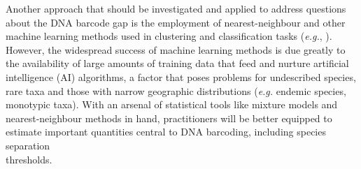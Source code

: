 Another approach that should be investigated and applied to address questions about the DNA barcode gap is the employment of nearest-neighbour and other machine learning methods used in clustering and classification tasks (\textit{e.g.}, \cite{vanvelzen2012dna}). However, the widespread success of machine learning methods is due greatly to the availability of large amounts of training data that feed and nurture artificial intelligence (AI) algorithms, a factor that poses problems for undescribed species, rare taxa and those with narrow geographic distributions (\textit{e.g.} endemic species, monotypic taxa). With an arsenal of statistical tools like mixture models and nearest-neighbour methods in hand, practitioners will be better equipped to estimate important quantities central to DNA barcoding, including species separation \\ thresholds.



